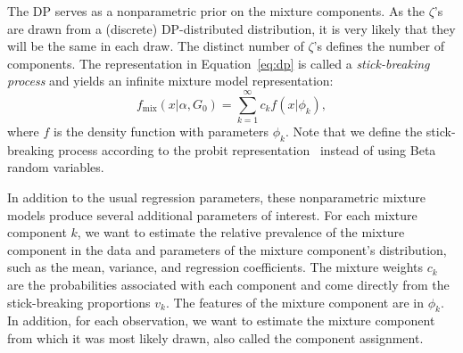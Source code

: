 \documentclass[a4paper,UKenglish]{oasics}
\begin{document}
The DP serves as a nonparametric prior on the mixture components. As the $\zeta$'s are drawn from a (discrete) DP-distributed distribution, it is very likely that they will be the same in each draw. The distinct number of $\zeta$'s defines the number of components.
The representation in Equation~\ref{eq:dp} is called a \emph{stick-breaking process} and yields an infinite mixture model representation:
$$
f_\text{mix}(x|\alpha, G_0) = \sum_{k=1}^{\infty} c_k f(x|\phi_k),
$$
where $f$ is the density function with parameters $\phi_k$. Note that we define the stick-breaking process according to the probit representation~\cite{rodriguez} instead of using Beta random variables.
% 
% 


In addition to the usual regression parameters, these nonparametric mixture models produce several additional parameters of interest. For each mixture component $k$, we want to estimate the relative prevalence of the mixture component in the data and parameters of the mixture component's distribution, such as the mean, variance, and regression coefficients. The mixture weights $c_k$ are the probabilities associated with each component and come directly from the  stick-breaking proportions $v_k$. The features of the mixture component are in $\phi_k$. In addition, for each observation, we want to estimate the mixture component from which it was most likely drawn, also called the component assignment.
\end{document}

